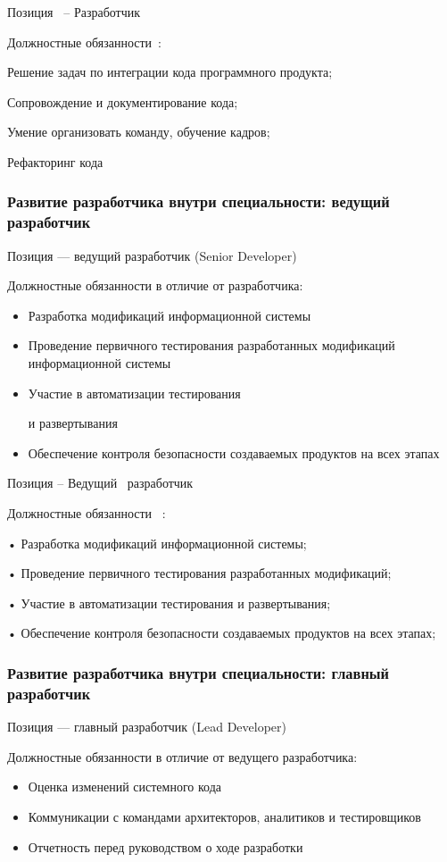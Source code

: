 \documentclass{../industrial-development}
\begin{document}
\lecturenotes

Позиция~\cite{hh} – Разработчик ~\cite{itcf}

Должностные обязанности~\cite{rab}:

Решение задач по интеграции кода программного продукта;

Сопровождение и документирование кода;

Умение организовать  команду, обучение кадров;

 Рефакторинг кода


\begin{frame} \frametitle{Развитие разработчика внутри специальности: ведущий разработчик}
 \begin{block}{}
  \alert{Позиция --- ведущий разработчик (Senior Developer)}

Должностные обязанности в отличие от разработчика: 
  \end{block}
  \begin{itemize}
  \item Разработка модификаций информационной системы
  \item Проведение первичного тестирования разработанных модификаций информационной системы
 \item  Участие в автоматизации тестирования 

и развертывания
  \item Обеспечение контроля безопасности создаваемых продуктов на всех этапах
  \end{itemize}
\end{frame}

\lecturenotes

Позиция – Ведущий~\cite{hh} разработчик~\cite{itcf}

Должностные обязанности~\cite{rab} :

• Разработка модификаций  информационной системы;

• Проведение первичного тестирования разработанных модификаций;

• Участие в автоматизации тестирования и развертывания;

• Обеспечение контроля безопасности создаваемых продуктов на всех этапах;

\begin{frame} \frametitle{Развитие разработчика внутри специальности: главный разработчик}
 \begin{block}{}
  \alert{Позиция --- главный разработчик (Lead Developer)}

Должностные обязанности в отличие от ведущего разработчика: 
  \end{block}
  \begin{itemize}
  \item Оценка изменений системного кода
  \item Коммуникации с командами архитекторов, аналитиков и тестировщиков
 \item  Отчетность перед руководством о ходе разработки
  \end{itemize}
\end{frame}
\end{document}
